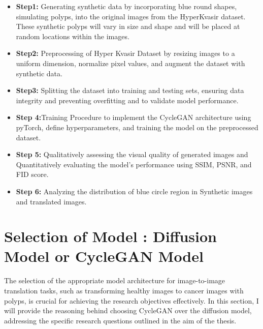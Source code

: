 \documentclass[UKenglish,12pt]{master-style}
\begin{document}
\begin{itemize}

\item \textbf{Step1:} Generating synthetic data by incorporating blue round shapes, simulating polyps, into the original images from the HyperKvasir dataset. These synthetic polyps will vary in size and shape and will be placed at random locations within the images.

\item \textbf{Step2:} Preprocessing of Hyper Kvasir Dataset by resizing images to a uniform dimension, normalize pixel values, and augment the dataset with synthetic data.

\item \textbf{Step3: }Splitting the dataset into training and testing sets, ensuring data integrity and preventing overfitting and to validate model performance.

\item \textbf{Step 4:}Training Procedure to implement the CycleGAN architecture using pyTorch, define hyperparameters, and training the model on the preprocessed dataset.

\item \textbf{Step 5: }Qualitatively assessing the visual quality of generated images and Quantitatively evaluating the model's performance using SSIM, PSNR, and FID score.

\item \textbf{Step 6: }Analyzing the distribution of blue circle region in Synthetic images and translated images.
\end{itemize}

\section{Selection of Model : Diffusion Model or CycleGAN Model}

The selection of the appropriate model architecture for image-to-image translation tasks, such as transforming healthy images to cancer images with polyps, is crucial for achieving the research objectives effectively. In this section, I will provide the reasoning behind choosing CycleGAN over the diffusion model, addressing the specific research questions outlined in the aim of the thesis.
\end{document}
